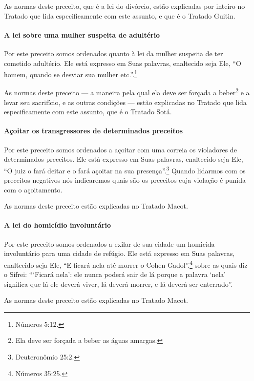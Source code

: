 As normas deste preceito, que é a lei do divórcio, estão explicadas por
inteiro no Tratado que lida especificamente com este assunto, e que é o
Tratado Guitin.

\paragraph{A lei sobre uma mulher suspeita de adultério}

Por este preceito somos ordenados quanto à lei da mulher suspeita de ter
cometido adultério. Ele está expresso em Suas palavras, enaltecido seja Ele,
``O homem, quando se desviar sua mulher etc.''.\footnote{Números 5:12.}

As normas deste preceito --- a maneira pela qual ela deve ser forçada a
beber\footnote{Ela deve ser forçada a beber as águas amargas.} e a levar seu sacrifício, e as outras
condições --- estão explicadas no Tratado que lida especificamente com
este assunto, que é o Tratado Sotá.

\paragraph{Açoitar os transgressores de determinados preceitos}

Por este preceito somos ordenados a açoitar com uma correia os
violadores de determinados preceitos. Ele está expresso em Suas
palavras, enaltecido seja Ele, ``O juiz o fará deitar e o fará açoitar
na sua presença''.\footnote{Deuteronômio 25:2.} Quando lidarmos com os preceitos
negativos nós indicaremos quais são os preceitos cuja violação é punida
com o açoitamento.

As normas deste preceito estão explicadas no Tratado Macot.

\paragraph{A lei do homicídio involuntário}

Por este preceito somos ordenados a exilar de sua cidade um homicida
involuntário para uma cidade de refúgio. Ele está expresso em Suas
palavras, enaltecido seja Ele, ``E ficará nela até morrer o Cohen
Gadol''.\footnote{Números 35:25.} sobre as quais diz o Sifrei: ```Ficará nela':
ele nunca poderá sair de lá porque a palavra `nela' significa que lá ele
deverá viver, lá deverá morrer, e lá deverá ser enterrado''.

As normas deste preceito estão explicadas no Tratado Macot.

